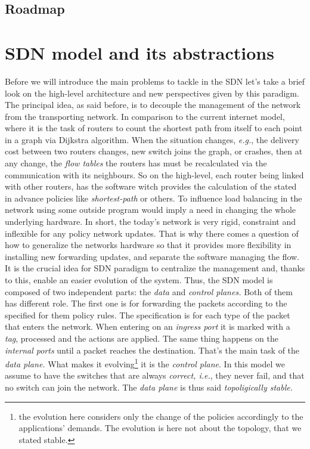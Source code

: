 \documentclass{article}
\begin{document}
\subsection{Roadmap}
\section{SDN model and its abstractions}
   Before we will introduce the main problems to tackle in the SDN let's take a brief look on the high-level architecture and new perspectives given by this paradigm.
The principal idea, as said before, is to decouple the management of the network from the transporting network. In comparison to the current internet model, where it is the task of routers to count the shortest path from itself to each point in a graph via Dijkstra algorithm. When the situation changes, \emph{e.g.}, the delivery cost between two routers changes, new switch joins the graph, or crashes, then at any change, the \emph{flow tables} the routers has must be recalculated via the communication with its neighbours. So on the high-level, each router being linked with other routers, has the software witch provides the calculation of the stated in advance policies like \emph{shortest-path} or others. To influence load balancing  in the network using some outside program would imply a need in changing the whole underlying hardware. In short, the today's network is very rigid, constraint and inflexible for any policy network updates.
That is why there comes a question of how to generalize the 
networks hardware so that it provides more flexibility in 
installing new forwarding updates, and separate the software 
managing the flow. It is the crucial idea for SDN paradigm
 to centralize the management and, thanks to this, enable an
 easier evolution of the system. 
Thus, the SDN model is composed of two independent parts:
 the \emph{data} and \emph{control planes.} Both of them has
different role. 
The first one is for forwarding the packets according to the specified for them policy rules. The specification is for each type of the packet that enters the network. When entering on an \emph{ingress port} it is marked with a \emph{tag}, processed and the actions are applied. The same thing happens on the \emph{internal ports} until a packet reaches the destination. That's the main task of the \emph{data plane.} What makes it evolving\footnote{the evolution here considers only the change of the policies accordingly to the applications' demands. The evolution is here not about the topology, that we stated stable.} it is the \emph{control plane}. In this model we assume to have the switches that are always \emph{correct, i.e.}, they never fail, and that no switch can join the network. The \emph{data plane} is thus said \emph{topoligically stable.}\\
\end{document}
